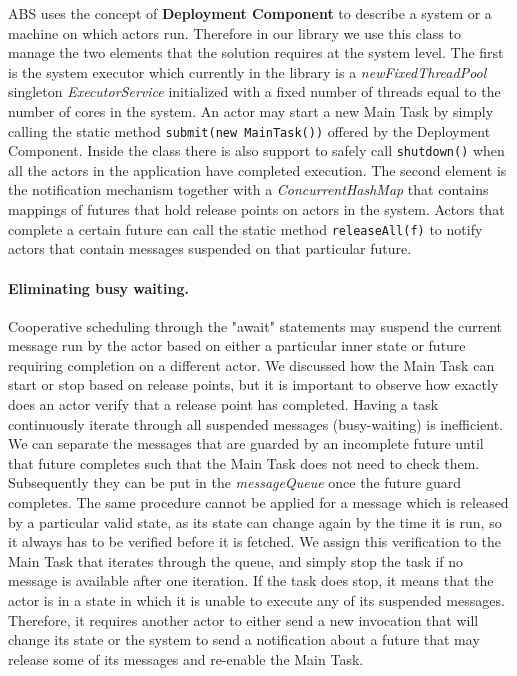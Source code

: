 \par ABS uses the concept of \textbf{Deployment Component} to describe a system or a machine on which actors run. Therefore in our library we use this class to manage the two elements that the solution requires at the system level. The first is the system executor which currently in the library is a \textit{newFixedThreadPool} singleton \textit{ExecutorService} initialized with a fixed number of threads equal to the number of cores in the system. An actor may start a new Main Task by simply calling the static method \lstinline|submit(new MainTask())| offered by the Deployment Component. Inside the class there is also support to safely call \lstinline|shutdown()| when all the actors in the application have completed execution. The second element is the notification mechanism together with a \textit{ConcurrentHashMap} that contains mappings of futures that hold release points on actors in the system. Actors that complete a certain future can call the static method \lstinline|releaseAll(f)| to notify actors that contain messages suspended on that particular future. 

\paragraph{Eliminating busy waiting.}
Cooperative scheduling through the "await" statements may suspend the current message run by the actor based on either a particular inner state or future requiring completion on a different actor. We discussed how the Main Task can start or stop based on release points, but it is important to observe how exactly does an actor verify that a release point has completed. Having a task continuously iterate through all suspended messages (busy-waiting) is inefficient. We can separate the messages that are guarded by an incomplete future until that future completes such that the Main Task does not need to check them. Subsequently they can be put in the \textit{messageQueue} once the future guard completes. The same procedure cannot be applied for a message which is released by a particular valid state, as its state can change again by the time it is run, so it always has to be verified before it is fetched. We assign this verification to the Main Task that iterates through the queue, and simply stop the task if no message is available after one iteration. If the task does stop, it means that the actor is in a state in which it is unable to execute any of its suspended messages. Therefore, it requires another actor to either send a new invocation that will change its state or the system to send a notification about a future that may release some of its messages and re-enable the Main Task. 


